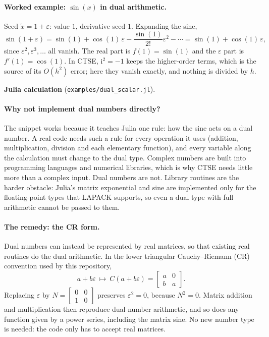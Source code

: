 \documentclass[11pt]{article}
\newcommand{\ii}{\mathrm i}
\newcommand{\juliascript}[1]{\par\medskip\needspace{6\baselineskip}\noindent
  \textbf{Julia calculation} (\nolinkurl{examples/#1}).\par
  }
\begin{document}
\paragraph{Worked example: $\sin(x)$ in dual arithmetic.}
Seed $\widetilde x=1+\varepsilon$: value $1$, derivative seed $1$. Expanding
the sine,
\[
 \sin(1+\varepsilon)
 =\sin(1)+\cos(1)\,\varepsilon-\frac{\sin(1)}{2!}\varepsilon^2-\cdots
 =\sin(1)+\cos(1)\,\varepsilon,
\]
since $\varepsilon^2,\varepsilon^3,\ldots$ all vanish. The real part is
$f(1)=\sin(1)$ and the $\varepsilon$ part is $f'(1)=\cos(1)$. In CTSE,
$\ii^2=-1$ keeps the higher-order terms, which is the source of its $O(h^2)$
error; here they vanish exactly, and nothing is divided by $h$.

\juliascript{dual_scalar.jl}

\paragraph{Why not implement dual numbers directly?}
The snippet works because it teaches Julia one rule: how the sine acts on a
dual number. A real code needs such a rule for every operation it uses
(addition, multiplication, division and each elementary function), and every
variable along the calculation must change to the dual type. Complex numbers
are built into programming languages and numerical libraries, which is why
CTSE needs little more than a complex input. Dual numbers are not. Library
routines are the harder obstacle: Julia's matrix exponential and sine are
implemented only for the floating-point types that LAPACK supports, so even a
dual type with full arithmetic cannot be passed to them.

\paragraph{The remedy: the CR form.}
Dual numbers can instead be represented by real matrices, so that existing
real routines do the dual arithmetic. In the lower triangular Cauchy--Riemann
(CR) convention used by this repository,
\[
 \boxed{a+b\varepsilon\ \longmapsto\ C(a+b\varepsilon)
       =\begin{bmatrix}a&0\\b&a\end{bmatrix}.}
\]
Replacing $\varepsilon$ by $N=\left[\begin{smallmatrix}0&0\\1&0\end{smallmatrix}\right]$
preserves $\varepsilon^2=0$, because $N^2=0$. Matrix addition and
multiplication then reproduce dual-number arithmetic, and so does any function
given by a power series, including the matrix sine. No new number type is
needed: the code only has to accept real matrices.
\end{document}
